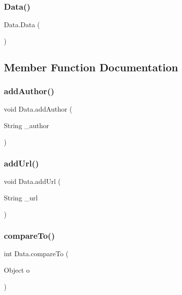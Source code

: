 \subsubsection{\texorpdfstring{Data()}{Data()}}
{\footnotesize\ttfamily Data.\+Data (\begin{DoxyParamCaption}{ }\end{DoxyParamCaption})}



\subsection{Member Function Documentation}
\hypertarget{class_data_aee77b766926cff5acb486c8993c39607}{}\label{class_data_aee77b766926cff5acb486c8993c39607} 
\subsubsection{\texorpdfstring{add\+Author()}{addAuthor()}}
{\footnotesize\ttfamily void Data.\+add\+Author (\begin{DoxyParamCaption}\item[{String}]{\+\_\+author }\end{DoxyParamCaption})}

\hypertarget{class_data_a0f3fd3bbb22e15759be23fc1bf8a54b9}{}\label{class_data_a0f3fd3bbb22e15759be23fc1bf8a54b9} 
\subsubsection{\texorpdfstring{add\+Url()}{addUrl()}}
{\footnotesize\ttfamily void Data.\+add\+Url (\begin{DoxyParamCaption}\item[{String}]{\+\_\+url }\end{DoxyParamCaption})}

\hypertarget{class_data_af0585a116e5d386a0d513b8f1549411a}{}\label{class_data_af0585a116e5d386a0d513b8f1549411a} 
\subsubsection{\texorpdfstring{compare\+To()}{compareTo()}}
{\footnotesize\ttfamily int Data.\+compare\+To (\begin{DoxyParamCaption}\item[{Object}]{o }\end{DoxyParamCaption})}

